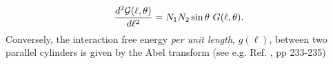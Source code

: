 \documentclass[onecolumn,letterpaper,amsmath,amssymb,floatfix,aps,superscriptaddress]{revtex4}
\begin{document}
%
%
%
\begin{equation}
\frac{d^{2}{\cal G}(\ell,\theta)}{d\ell^{2}}= N_1 N_2\sin{\theta}~G(\ell,\theta).
\label{form1}
\end{equation}
Conversely, the interaction free energy {\sl per unit length}, $g(\ell)$, between two parallel cylinders is given by the Abel transform (see e.g. Ref. , pp 233-235)
\end{document}
